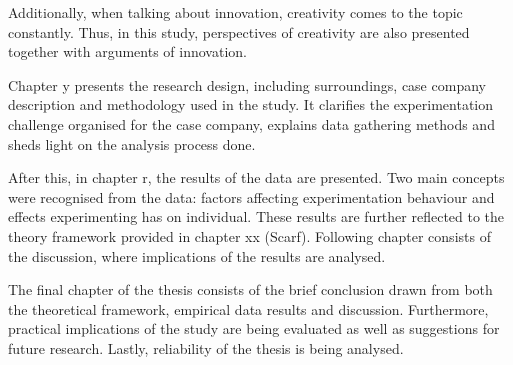 Additionally, when talking about innovation, creativity comes to the topic constantly. Thus, in this study, perspectives of creativity are also presented together 
with arguments of innovation. 

Chapter y presents the research design, including surroundings,  case company description and methodology used in the study.   It clarifies the experimentation 
challenge organised for the case company, explains data gathering methods and sheds light on the analysis process done. 

After this, in chapter r, the results of the data are presented. Two main concepts were recognised from the data: factors affecting experimentation behaviour and effects 
experimenting has on individual. These results are further reflected to the theory framework provided in chapter xx (Scarf). Following chapter consists of the discussion, 
where implications of the results are analysed. 

The final chapter of the thesis consists of the brief conclusion drawn from both the theoretical framework, empirical data results and discussion. Furthermore, practical 
implications of the study are being evaluated as well as suggestions for future research. Lastly, reliability of the thesis is being analysed. 
